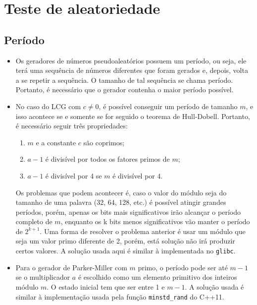 \documentclass{article}
\begin{document}
\section*{Teste de aleatoriedade}
    \subsection*{Período}
    \begin{itemize}
        \item Os geradores de números pseudoaleatórios possuem um período, ou
            seja, ele terá uma sequência de números diferentes que foram
            gerados e, depois, volta a se repetir a sequência. O tamanho de tal
            sequência se chama período. Portanto, é necessário que o gerador
            contenha o maior período possível.
    
        \item No caso do LCG com $c \neq 0$, é possível conseguir um período de
            tamanho $m$, e isso acontece se e somente se for seguido o teorema
            de Hull-Dobell. Portanto, é necessário seguir três
            propriedades:\cite{Knuth1981}
        \begin{enumerate}
            \item $m$ e a constante $c$ são coprimos;
            \item $a-1$ é divisível por todos os fatores primos de $m$;
            \item $a-1$ é divisível por 4 se $m$ é divisível por 4.
        \end{enumerate}
        Os problemas que podem acontecer é, caso o valor do módulo seja do
            tamanho de uma palavra (32, 64, 128, etc.) é possível atingir
            grandes períodos, porém, apenas os bits mais significativos irão
            alcançar o período completo de $m$, enquanto os k bits menos
            significativos vão manter o período de $2^{k+1}$. Uma forma de
            resolver o problema anterior é usar um módulo que seja um valor
            primo diferente de 2, porém, está solução não irá produzir certos
            valores. A solução usada aqui é similar à implementada no
            \texttt{glibc}.
    
        \item Para o gerador de Parker-Miller com $m$ primo, o período pode ser
            até $m-1$ se o multiplicador $a$ é escolhido como um elemento
            primitivo dos inteiros módulo $m$. O estado inicial tem que ser
            entre 1 e $m-1$. A solução usada é similar à implementação usada
            pela função \texttt{minstd\_rand} do C++11.
    

\end{itemize}
\end{document}
